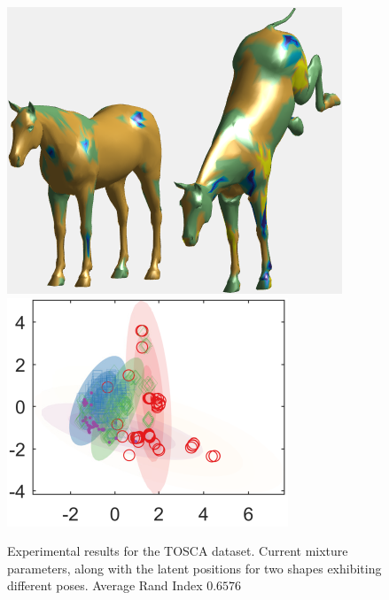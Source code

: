 \documentclass[]{article}
\newcommand{\gD}[2]{\mathcal{N}\left(#1,#2\right)}
\newcommand{\eye}{\mathbf{I}}
\newcommand{\setWv}{\mathbf{W}^{v}}
\newcommand{\setYv}{\mathbf{Y}^{v}}
\newcommand{\setXv}{\mathbf{X}^{v}}
\newcommand{\setZv}{\mathbf{Z}^{v}}
\newcommand{\setFv}{\mathbf{F}^{v}}
\newcommand{\hParams}{\boldsymbol{\theta}}
\begin{document}
\begin{figure}[ht!]
	\centering
	
	\includegraphics[width=0.55\linewidth]{img/horseMVMMexp1}
	\includegraphics[width=0.35\linewidth]{img/horseMVMMexp3}
	\caption{Experimental results for the TOSCA dataset. Current mixture parameters, along with the latent positions for two shapes exhibiting different poses. Average Rand Index $0.6576$ }
\end{figure}
%
%
%
%
%
%
%




\end{document}
